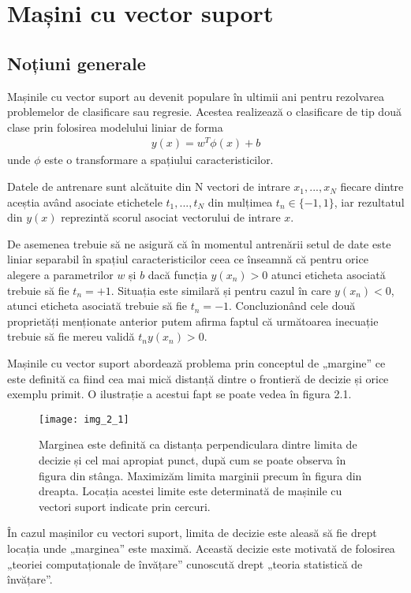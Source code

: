 \section{Mașini cu vector suport}

\subsection{Noțiuni generale}

Mașinile cu vector suport au devenit populare în ultimii ani pentru rezolvarea problemelor de clasificare sau regresie. Acestea realizează o clasificare de tip două clase prin folosirea modelului liniar de forma
\begin{align}
	y(x) = w^T\phi(x) + b
\end{align}
unde $\phi$ este o transformare a spațiului caracteristicilor.

Datele de antrenare sunt alcătuite din N vectori de intrare $x_1, ...,x_N$ fiecare dintre aceștia având asociate etichetele $t_1, ...,t_N$ din mulțimea $t_n \in \{-1,1\}$, iar rezultatul din $y(x)$ reprezintă scorul asociat vectorului de intrare $x$.

De asemenea trebuie să ne asigură că în momentul antrenării setul de date este liniar separabil în spațiul caracteristicilor ceea ce înseamnă că pentru orice alegere a parametrilor $w$ și $b$ dacă funcția $y(x_n) > 0$ atunci eticheta asociată trebuie să fie $t_n = +1$. Situația este similară și pentru cazul în care $y(x_n ) < 0$, atunci eticheta asociată trebuie să fie $t_n = -1$. 
Concluzionând cele două proprietăți menționate anterior putem afirma faptul că următoarea inecuație trebuie să fie mereu validă  $t_n y(x_n) > 0$. 

Mașinile cu vector suport abordează problema prin conceptul de „margine” ce este definită ca fiind cea mai mică distanță dintre o frontieră de decizie și orice exemplu primit. O ilustrație a acestui fapt se poate vedea în figura 2.1.
\begin{figure}[!h]
	\centering
	\texttt{[image: img\_2\_1]}
	\caption[Mașini cu vector suport]{Marginea este definită ca distanța perpendiculara dintre limita de decizie și cel mai apropiat punct, după cum se poate observa în figura din stânga. Maximizăm limita marginii precum în figura din dreapta. Locația acestei limite este determinată de mașinile cu vectori suport indicate prin cercuri.}
\end{figure} 

În cazul mașinilor cu vectori suport, limita de decizie este aleasă să fie drept locația unde „marginea” este maximă. Această decizie este motivată de folosirea „teoriei computaționale de învățare” cunoscută drept „teoria statistică de învățare”. 


